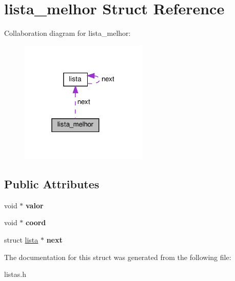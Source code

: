 \hypertarget{structlista__melhor}{}\section{lista\+\_\+melhor Struct Reference}
\label{structlista__melhor}


Collaboration diagram for lista\+\_\+melhor\+:
\nopagebreak
\begin{figure}[H]
\begin{center}
\leavevmode
\includegraphics[width=172pt]{structlista__melhor__coll__graph}
\end{center}
\end{figure}
\subsection*{Public Attributes}
\begin{DoxyCompactItemize}
\item 
\mbox{\label{structlista__melhor_a557aadd45cee0a0490d5b673711f05a0}} 
void $\ast$ {\bfseries valor}
\item 
\mbox{\label{structlista__melhor_a759e9837330b5d64135872541ba76a13}} 
void $\ast$ {\bfseries coord}
\item 
\mbox{\label{structlista__melhor_a3660b043cab71e94bd50cbcf06231bde}} 
struct \hyperlink{structlista}{lista} $\ast$ {\bfseries next}
\end{DoxyCompactItemize}


The documentation for this struct was generated from the following file\+:\begin{DoxyCompactItemize}
\item 
listas.\+h\end{DoxyCompactItemize}
